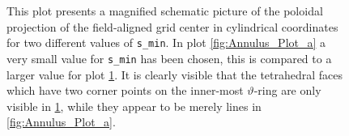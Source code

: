\documentclass[./main.tex]{subfiles}
\begin{document}
\begin{figure}[!ht]
\begin{subfigure}[b]{0.45\textwidth}
		\captionsetup{width=.4\textwidth}
		\caption{}
		\label{fig:Annulus_Plot_b}
	\end{subfigure}\hfill
		\caption{This plot presents a magnified schematic picture of the poloidal projection of the field-aligned grid center in cylindrical coordinates for two different values of \texttt{s\_min}. In plot \ref{fig:Annulus_Plot_a} a very small value for \texttt{s\_min} has been chosen, this is compared to a larger value for plot \ref{fig:Annulus_Plot_b}. It is clearly visible that the tetrahedral faces which have two corner points on the inner-most $\vartheta$-ring are only visible in \ref{fig:Annulus_Plot_b}, while they appear to be merely lines in \ref{fig:Annulus_Plot_a}.}
\label{fig:Annulus_Plot}
\end{figure}
\end{document}
